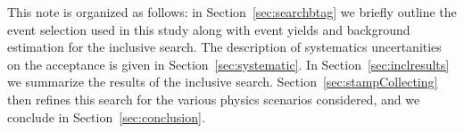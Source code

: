 This note is organized as follows: in Section~\ref{sec:searchbtag} we briefly outline the event selection used in this study 
along with event yields and background estimation for the inclusive search.
%
The description of systematics uncertanities on the 
acceptance is given in Section~\ref{sec:systematic}.  
%
In Section~\ref{sec:inclresults} we summarize the results 
of the inclusive search.
Section~\ref{sec:stampCollecting} then refines this search for the various physics scenarios considered, and
we conclude in Section~\ref{sec:conclusion}.





